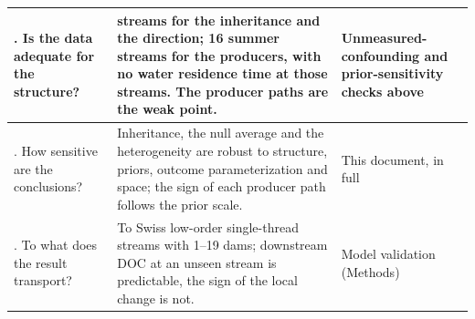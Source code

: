 \documentclass[11pt,a4paper]{article}
\begin{document}
\begin{center}
\begin{small}
\begin{longtable}{|>{\raggedright\arraybackslash}p{}|>{\raggedright\arraybackslash}p{}|>{\raggedright\arraybackslash}p{}|}
6. Is the data adequate for the structure? & 158 streams for the inheritance and the direction; 16 summer streams for the producers, with no water residence time at those streams. The producer paths are the weak point. & Unmeasured-confounding and prior-sensitivity checks above \\ \hline
7. How sensitive are the conclusions? & Inheritance, the null average and the heterogeneity are robust to structure, priors, outcome parameterization and space; the sign of each producer path follows the prior scale. & This document, in full \\ \hline
8. To what does the result transport? & To Swiss low-order single-thread streams with 1--19 dams; downstream DOC at an unseen stream is predictable, the sign of the local change is not. & Model validation (Methods) \\ \hline
\end{longtable}
\end{small}
\end{center}

\FloatBarrier
\end{document}
